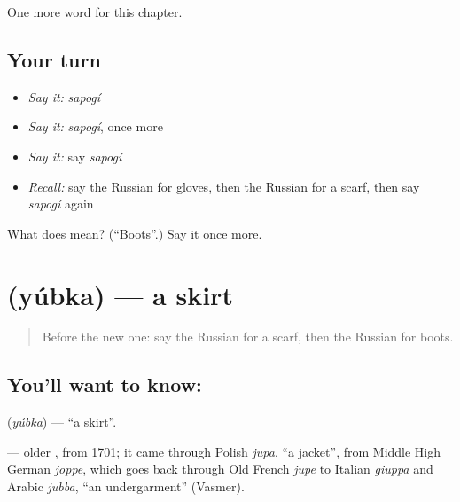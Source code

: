 \begin{grammarlens}[title={What you've built}]
One more word for this chapter.
\end{grammarlens}

\subsection*{Your turn}
\begin{itemize}
\raggedright
  \item \emph{Say it:} \emph{sapogí}
  \item \emph{Say it:} \emph{sapogí}, once more
  \item \emph{Say it:} say \emph{sapogí}
  \item \emph{Recall:} say the Russian for gloves, then the Russian for a scarf, then say \emph{sapogí} again
\end{itemize}

\begin{tcolorbox}[breakable,colback=teal!4,colframe=teal!35!black,title={Before you move on}]
What does  mean? (\textquotedblleft{}Boots\textquotedblright{}.) Say it once more.
\end{tcolorbox}
\section[\texorpdfstring{\ru{юбка} (yúbka)}{юбка (yúbka)}]{ (yúbka) — a skirt}

\label{lesson:RU-C102-skirt}



\begin{quote}
Before the new one: say the Russian for a scarf, then the Russian for boots.
\end{quote}

\subsection*{You'll want to know: }
\textbf{} (\emph{yúbka}) — \textquotedblleft{}a skirt\textquotedblright{}.

\begin{cousinweb}
\textbf{} — older \emph{}, from 1701; it came through Polish \emph{jupa}, \textquotedblleft{}a jacket\textquotedblright{}, from Middle High German \emph{joppe}, which goes back through Old French \emph{jupe} to Italian \emph{giuppa} and Arabic \emph{jubba}, \textquotedblleft{}an undergarment\textquotedblright{} (Vasmer).
\end{cousinweb}

